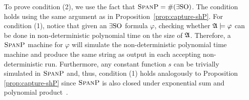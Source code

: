 To prove condition (2), we use the fact that $\text{\sc SpanP} = \#(\exists{\rm SO})$. The condition holds using the same argument as in Proposition~\ref{prop:capture-shP}.
For condition (1), notice that given an $\exists{\rm SO}$ formula $\varphi$, checking whether $\mathfrak{A}\models\varphi$ can be done in non-deterministic polynomial time on the size of $\mathfrak{A}$\cite{fagin1974generalized}. 
Therefore, a $\text{\sc SpanP}$ machine for $\varphi$ will simulate the non-deterministic polynomial time machine and produce the same string as output in each accepting non-deterministic run. Furthermore, any constant function $s$ can be trivially simulated in $\text{\sc SpanP}$ and, thus, condition (1) holds analogously to Proposition \ref{prop:capture-shP} since $\text{\sc SpanP}$ is also closed under exponential sum and polynomial product~\cite{OH93}.
